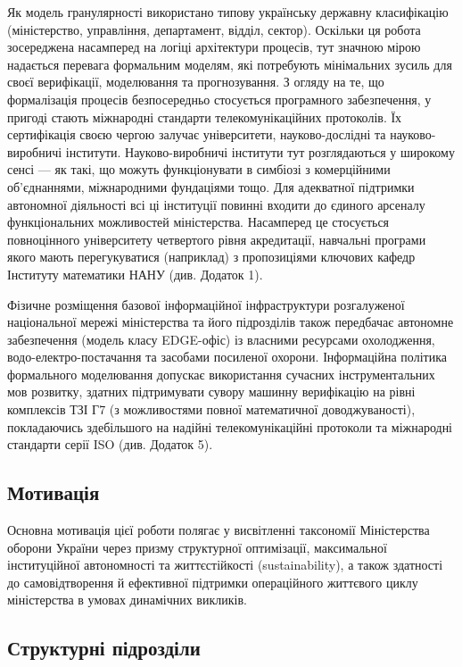 Як модель гранулярності використано типову українську державну класифікацію (міністерство, управління, департамент, відділ, сектор). Оскільки ця робота зосереджена насамперед на логіці архітектури процесів, тут значною мірою надається перевага формальним моделям, які потребують мінімальних зусиль для своєї верифікації, моделювання та прогнозування. З огляду на те, що формалізація процесів безпосередньо стосується програмного забезпечення, у пригоді стають міжнародні стандарти телекомунікаційних протоколів. Їх сертифікація своєю чергою залучає університети, науково-дослідні та науково-виробничі інститути. Науково-виробничі інститути тут розглядаються у широкому сенсі --- як такі, що можуть функціонувати в симбіозі з комерційними об'єднаннями, міжнародними фундаціями тощо. Для адекватної підтримки автономної діяльності всі ці інституції повинні входити до єдиного арсеналу функціональних можливостей міністерства. Насамперед це стосується повноцінного університету четвертого рівня акредитації, навчальні програми якого мають перегукуватися (наприклад) з пропозиціями ключових кафедр Інституту математики НАНУ (див. Додаток 1). 

Фізичне розміщення базової інформаційної інфраструктури розгалуженої національної мережі міністерства та його підрозділів також передбачає автономне забезпечення (модель класу EDGE-офіс) із власними ресурсами охолодження, водо-електро-постачання та засобами посиленої охорони. Інформаційна політика формального моделювання допускає використання сучасних інструментальних мов розвитку, здатних підтримувати сувору машинну верифікацію на рівні комплексів ТЗІ Г7 (з можливостями повної математичної доводжуваності), покладаючись здебільшого на надійні телекомунікаційні протоколи та міжнародні стандарти серії ISO (див. Додаток 5).

\subsection*{Мотивація}

Основна мотивація цієї роботи полягає у висвітленні таксономії Міністерства оборони України через призму структурної оптимізації, максимальної інституційної автономності та життєстійкості (sustainability), а також здатності до самовідтворення й ефективної підтримки операційного життєвого циклу міністерства в умовах динамічних викликів.

\subsection*{Структурні підрозділи}

